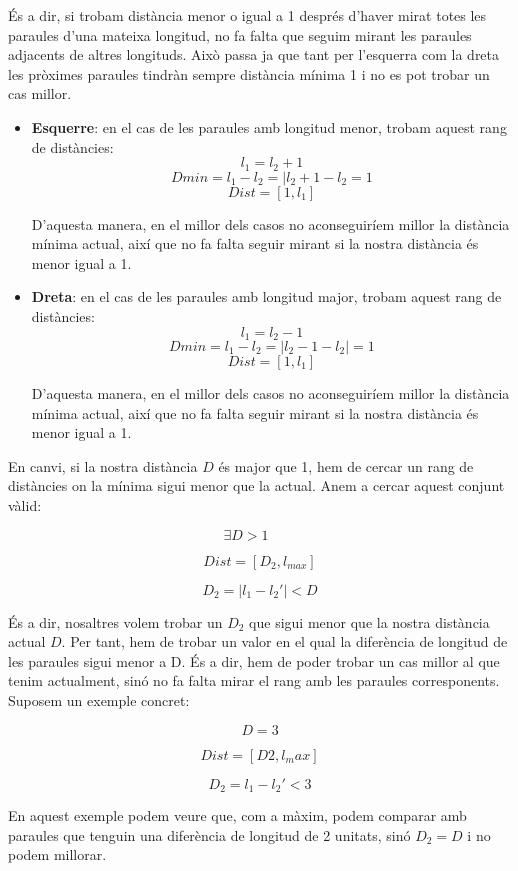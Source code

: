 \documentclass[conference]{IEEEtran}
\begin{document}
\begin{itemize}
        És a dir, si trobam distància menor o igual a 1 després d'haver mirat totes les paraules d'una mateixa longitud, no fa falta que seguim mirant les paraules adjacents de altres longituds. Això passa ja que tant per l'esquerra com la dreta les pròximes paraules tindràn sempre distància mínima 1 i no es pot trobar un cas millor. 

        \begin{itemize}
            \item \textbf{Esquerre}: en el cas de les paraules amb longitud menor, trobam aquest rang de distàncies:
            $$l_1=l_2+1$$
            $$Dmin=l_1-l_2=|l_2+1-l_2=1$$
            $$Dist=[1,l_1]$$

            D'aquesta manera, en el millor dels casos no aconseguiríem millor la distància mínima actual, així que no fa falta seguir mirant si la nostra distància és menor igual a 1.
            
            \item \textbf{Dreta}: en el cas de les paraules amb longitud major, trobam aquest rang de distàncies:
                        $$l_1=l_2-1$$
                        $$Dmin=l_1-l_2=|l_2-1-l_2|=1$$
                        $$Dist=[1,l_1]$$

            D'aquesta manera, en el millor dels casos no aconseguiríem millor la distància mínima actual, així que no fa falta seguir mirant si la nostra distància és menor igual a 1.
        \end{itemize}

        En canvi, si la nostra distància $D$ és major que 1, hem de cercar un rang de distàncies on la mínima sigui menor que la actual. Anem a cercar aquest conjunt vàlid:

        $$\exists D>1 \quad  \quad$$

        $$Dist=[D_2,l_{max}]$$

        $$D_2=|l_1-l_2'|<D$$

        És a dir, nosaltres volem trobar un $D_2$ que sigui menor que la nostra distància actual $D$. Per tant, hem de trobar un valor en el qual la diferència de longitud de les paraules sigui menor a D. És a dir, hem de poder trobar un cas millor al que tenim actualment, sinó no fa falta mirar el rang amb les paraules corresponents.\\ Suposem un exemple concret:

        $$D=3$$

        $$Dist=[D2,l_max]$$

        $$D_2=l_1-l_2'<3$$

        En aquest exemple podem veure que, com a màxim, podem comparar amb paraules que tenguin una diferència de longitud de 2 unitats, sinó $D_2=D$ i no podem millorar.
    
        

        
    \end{itemize}
    
\end{document}
